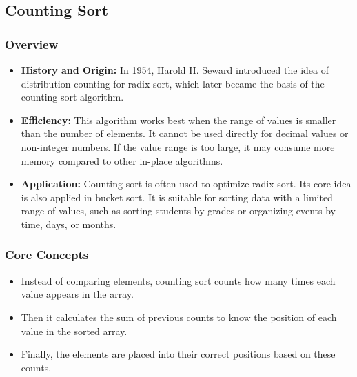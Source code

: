\subsection[Counting Sort]{Counting Sort\cite[p.194~196]{cormen2009introduction} \cite{gfg_countingsort}}
    \subsubsection{Overview}
        \begin{itemize}
            \item \textbf{History and Origin:} In 1954, Harold H. Seward introduced the idea of distribution counting for radix sort\cite[p.~170]{knuth1998sorting}, which later became the basis of the counting sort algorithm.
            \item \textbf{Efficiency:} This algorithm works best when the range of values is smaller than the number of elements. It cannot be used directly for decimal values or non-integer numbers. If the value range is too large, it may consume more memory compared to other in-place algorithms.
            \item \textbf{Application:} Counting sort is often used to optimize radix sort. Its core idea is also applied in bucket sort. It is suitable for sorting data with a limited range of values, such as sorting students by grades or organizing events by time, days, or months.
        \end{itemize}
    \subsubsection{Core Concepts}
        \begin{itemize}
            \item Instead of comparing elements, counting sort counts how many times each value appears in the array.
            \item Then it calculates the sum of previous counts to know the position of each value in the sorted array.
            \item Finally, the elements are placed into their correct positions based on these counts.
        \end{itemize}
